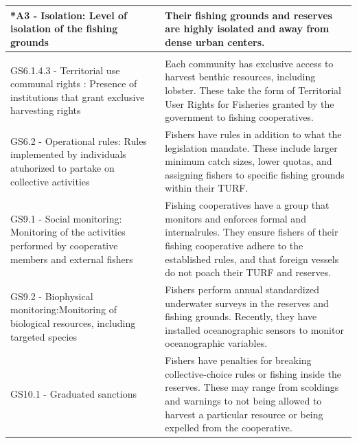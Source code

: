 \documentclass{frontiersSCNS}
\theoremstyle{definition}
\theoremstyle{definition}
\theoremstyle{definition}
\theoremstyle{remark}
\begin{document}
\begin{table}[H]
{\begin{tabular}[t]{>{\raggedright\arraybackslash}p{6.5cm}|>{\raggedright\arraybackslash}p{12cm}}
\hline
\hspace{1em}*A3 - Isolation: Level of isolation of the fishing grounds & Their fishing grounds and reserves are highly isolated and away from dense urban centers.\\
\hline
\multicolumn{2}{l}{\textbf{Governance system (G)}}\\
\hline
\hspace{1em}GS6.1.4.3 - Territorial use communal rights : Presence of institutions that grant exclusive harvesting rights & Each community has exclusive access to harvest benthic resources, including lobster. These take the form of Territorial User Rights for Fisheries granted by the government to fishing cooperatives.\\
\hline
\hspace{1em}GS6.2 - Operational rules: Rules implemented by individuals atuhorized to partake on collective activities & Fishers have rules in addition to what the legislation mandate. These include larger minimum catch sizes, lower quotas, and assigning fishers to specific fishing grounds within their TURF.\\
\hline
\hspace{1em}GS9.1 - Social monitoring: Monitoring of the activities performed by cooperative members and external fishers & Fishing cooperatives have a group that monitors and enforces formal and internalrules. They ensure fishers of their fishing cooperative adhere to the established rules, and that foreign vessels do not poach their TURF and reserves.\\
\hline
\hspace{1em}GS9.2 - Biophysical monitoring:Monitoring of biological resources, including targeted species & Fishers perform annual standardized underwater surveys in the reserves and fishing grounds. Recently, they have installed oceanographic sensors to monitor oceanographic variables.\\
\hline
GS10.1 - Graduated sanctions & Fishers have penalties for breaking collective-choice rules or fishing inside the reserves. These may range from scoldings and warnings to not being allowed to harvest a particular resource or being expelled from the cooperative.\\
\hline
\end{tabular}}
\end{table}
\end{document}
